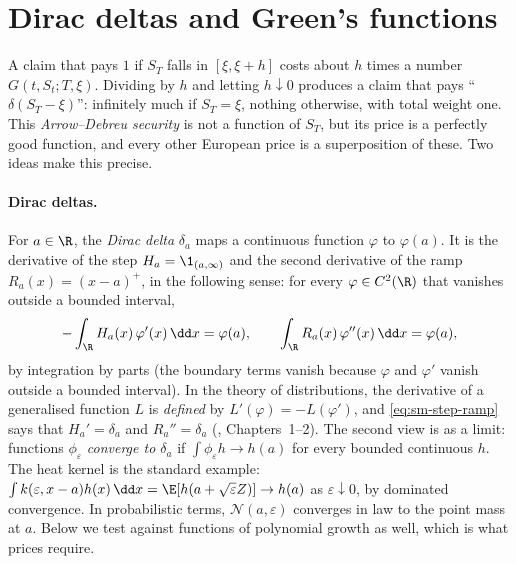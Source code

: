 
\section{Dirac deltas and Green's functions}\label{sec:sm-green}

A claim that pays $1$ if $S_T$ falls in $[\xi,\xi+h]$ costs about $h$ times a number
$G(t,S_t;T,\xi)$. Dividing by $h$ and letting $h\downarrow0$ produces a claim that pays
``$\delta(S_T-\xi)$'': infinitely much if $S_T=\xi$, nothing otherwise, with total weight one.
This \emph{Arrow--Debreu security} is not a function of $S_T$, but its price is a perfectly good
function, and every other European price is a superposition of these. Two ideas make this
precise.

\paragraph{Dirac deltas.} For $a\in\R$, the \emph{Dirac delta} $\delta_a$ maps a continuous
function $\varphi$ to $\varphi(a)$. It is the derivative of the step $H_a=\1_{(a,\infty)}$ and the
second derivative of the ramp $R_a(x)=(x-a)^+$, in the following sense: for every
$\varphi\in C^2(\R)$ that vanishes outside a bounded interval,
\begin{equation}\label{eq:sm-step-ramp}
  -\int_\R H_a(x)\,\varphi'(x)\,\dd x=\varphi(a),\qquad\int_\R R_a(x)\,\varphi''(x)\,\dd x=\varphi(a),
\end{equation}
by integration by parts (the boundary terms vanish because $\varphi$ and $\varphi'$ vanish outside
a bounded interval). In the theory of distributions, the derivative of a generalised function $L$
is \emph{defined} by $L'(\varphi)=-L(\varphi')$, and \eqref{eq:sm-step-ramp} says that $H_a'=\delta_a$
and $R_a''=\delta_a$ (\textcite{strichartz-distributions}, Chapters~1--2). The second view is as
a limit: functions $\phi_\varepsilon$ \emph{converge to $\delta_a$} if
$\int\phi_\varepsilon h\to h(a)$ for every bounded continuous $h$. The heat kernel is the standard
example: $\int k(\varepsilon,x-a)h(x)\,\dd x=\E[h(a+\sqrt\varepsilon Z)]\to h(a)$ as
$\varepsilon\downarrow0$, by dominated convergence. In probabilistic terms, $\mathcal N(a,\varepsilon)$
converges in law to the point mass at $a$. Below we test against functions of polynomial
growth as well, which is what prices require.


